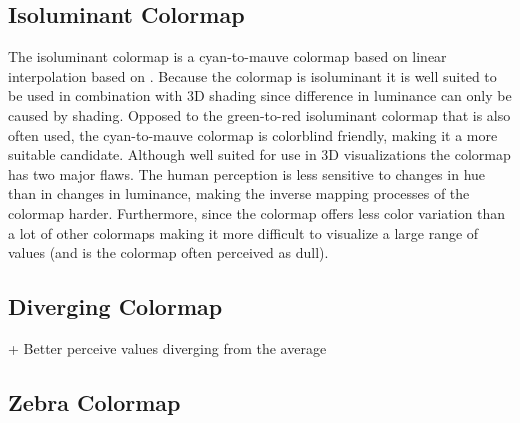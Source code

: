 \subsection{Isoluminant Colormap} %
\label{sub:two_hue_colormap}
The isoluminant colormap is a cyan-to-mauve colormap based on linear interpolation based on \cite{divergingMoreland2009}. Because the colormap is isoluminant it is well suited to be used in combination with 3D shading since difference in luminance can only be caused by shading. Opposed to the green-to-red isoluminant colormap that is also often used, the cyan-to-mauve colormap is colorblind friendly, making it a more suitable candidate. Although well suited for use in 3D visualizations the colormap has two major flaws. The human perception is less sensitive to changes in hue than in changes in luminance, making the inverse mapping processes of the colormap harder. Furthermore, since the colormap offers less color variation than a lot of other colormaps making it more difficult to visualize a large range of values (and is the colormap often perceived as dull).

\subsection{Diverging Colormap} %
\label{sub:diverging_colormap}


+ Better perceive values diverging from the average
\subsection{Zebra Colormap} %
\label{sub:zebra_colormap}
